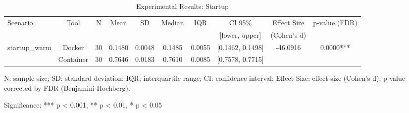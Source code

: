\documentclass{article}
\begin{document}

\begin{table}[h]
\centering
\small
\caption{Experimental Results: Startup}
\label{tab:startup}
\begin{tabular}{lccccccccc}
\toprule
Scenario & Tool & N & Mean & SD & Median & IQR & CI 95\% & Effect Size & p-value (FDR) \\
 & & & & & & & [lower, upper] & (Cohen's d) & \\
\midrule
\multirow{2}{*}{startup\_warm} & Docker & 30 & 0.1480 & 0.0048 & 0.1485 & 0.0055 & [0.1462, 0.1498] & -46.0916 & 0.0000*** \\
 & Container & 30 & 0.7646 & 0.0183 & 0.7610 & 0.0085 & [0.7578, 0.7715] &  &  \\
\midrule
\bottomrule
\end{tabular}
\begin{tablenotes}
\small
\item N: sample size; SD: standard deviation; IQR: interquartile range; CI: confidence interval; Effect Size: effect size (Cohen's d); p-value corrected by FDR (Benjamini-Hochberg).
\item Significance: *** p < 0.001, ** p < 0.01, * p < 0.05
\end{tablenotes}
\end{table}
\end{document}
